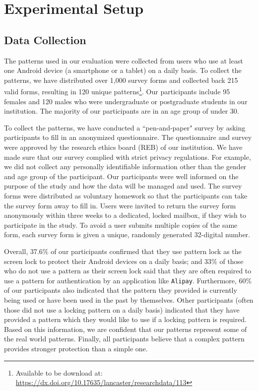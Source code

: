 

\section{Experimental Setup \label{sec:setup}}
    \subsection{Data Collection}
    \label{section:locking patterns}
    The patterns used in our evaluation were collected from users who use at least one Android device (a smartphone or a tablet) on a daily basis.
    To collect the patterns, we have distributed over 1,000 survey forms and collected back 215 valid forms, resulting in 120 unique patterns\footnote{Available to be download at: \url{https://dx.doi.org/10.17635/lancaster/researchdata/113}}.
    Our participants include 95 females and 120 males who were undergraduate or postgraduate students in our institution.
    The majority of our participants are in an age group of under 30.


    To collect the patterns, we have conducted a ``pen-and-paper" survey by asking participants to fill in an anonymized questionnaire.
    The questionnaire and survey were approved by the research ethics board (REB) of our institution.
    We have made sure that our survey complied with strict privacy regulations. For example, we did not collect any personally identifiable information other than the gender and age group of the participant. Our participants were well informed on the purpose
    of the study and how the data will be managed and used. The survey forms were distributed as voluntary homework so that the participants can take the survey form away to fill in.
     Users were invited to return the survey form anonymously within three weeks to a dedicated, locked mailbox, if they wish to participate in the study.
     To avoid a user submits multiple copies of the same form, each survey form is given a unique, randomly generated 32-digital number.


     Overall, 37.6\% of our participants confirmed that they use pattern lock as the screen lock to
     protect their Android devices on a daily basis; and 33\% of those  who do not use a pattern as their screen lock said that they
     are often required to use a pattern for authentication by an application like \texttt{Alipay}. Furthermore, 60\%
     of our participants also indicated that the pattern they provided is currently being used
     or have been used in the past by themselves. Other participants (often those did not use a locking pattern on a daily basis) indicated that they
     have provided a pattern which they would like to use if a locking
     pattern is required. Based on this information, we are confident
     that our patterns represent some of the real world
     patterns. Finally, all participants believe that a complex pattern provides stronger protection than a simple one.

